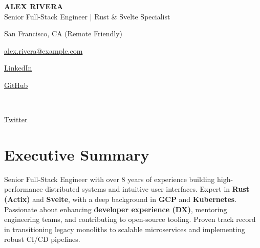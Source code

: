 \documentclass[11pt,letterpaper]{article}
\begin{document}
\begin{center}
    {\Huge\bfseries\color{textcolor} \MakeUppercase{Alex Rivera} } \\
    \vspace{0.2cm}
    {\Large\color{sectioncolor} Senior Full-Stack Engineer | Rust \& Svelte Specialist } \\
    \vspace{0.2cm}
    
    \small
    
         San Francisco, CA (Remote Friendly) \quad
    
    
         \href{mailto:alex.rivera@example.com}{alex.rivera@example.com} \quad
    
    
    
         \href{linkedin.com/in/arivera-dev}{LinkedIn} \quad
    
    
         \href{github.com/arivera-codes}{GitHub}
    
    
    
        \\ \vspace{0.1cm}
        
               \href{https://twitter.com/arivera\_dev}{Twitter} \quad
        
    
\end{center}

\vspace{0.2cm}


\section{Executive Summary}
\color{textcolor}
Senior Full-Stack Engineer with over 8 years of experience building high-performance distributed systems and intuitive user interfaces. Expert in \textbf{Rust (Actix)} and \textbf{Svelte}, with a deep background in \textbf{GCP} and \textbf{Kubernetes}. Passionate about enhancing \textbf{developer experience (DX)}, mentoring engineering teams, and contributing to open-source tooling. Proven track record in transitioning legacy monoliths to scalable microservices and implementing robust CI/CD pipelines.


\end{document}
